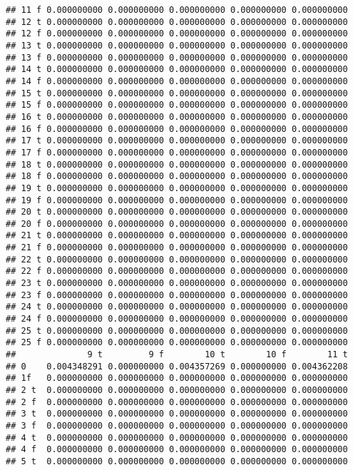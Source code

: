 \documentclass[]{article}
\begin{document}
\begin{verbatim}
## 11 f 0.000000000 0.000000000 0.000000000 0.000000000 0.000000000
## 12 t 0.000000000 0.000000000 0.000000000 0.000000000 0.000000000
## 12 f 0.000000000 0.000000000 0.000000000 0.000000000 0.000000000
## 13 t 0.000000000 0.000000000 0.000000000 0.000000000 0.000000000
## 13 f 0.000000000 0.000000000 0.000000000 0.000000000 0.000000000
## 14 t 0.000000000 0.000000000 0.000000000 0.000000000 0.000000000
## 14 f 0.000000000 0.000000000 0.000000000 0.000000000 0.000000000
## 15 t 0.000000000 0.000000000 0.000000000 0.000000000 0.000000000
## 15 f 0.000000000 0.000000000 0.000000000 0.000000000 0.000000000
## 16 t 0.000000000 0.000000000 0.000000000 0.000000000 0.000000000
## 16 f 0.000000000 0.000000000 0.000000000 0.000000000 0.000000000
## 17 t 0.000000000 0.000000000 0.000000000 0.000000000 0.000000000
## 17 f 0.000000000 0.000000000 0.000000000 0.000000000 0.000000000
## 18 t 0.000000000 0.000000000 0.000000000 0.000000000 0.000000000
## 18 f 0.000000000 0.000000000 0.000000000 0.000000000 0.000000000
## 19 t 0.000000000 0.000000000 0.000000000 0.000000000 0.000000000
## 19 f 0.000000000 0.000000000 0.000000000 0.000000000 0.000000000
## 20 t 0.000000000 0.000000000 0.000000000 0.000000000 0.000000000
## 20 f 0.000000000 0.000000000 0.000000000 0.000000000 0.000000000
## 21 t 0.000000000 0.000000000 0.000000000 0.000000000 0.000000000
## 21 f 0.000000000 0.000000000 0.000000000 0.000000000 0.000000000
## 22 t 0.000000000 0.000000000 0.000000000 0.000000000 0.000000000
## 22 f 0.000000000 0.000000000 0.000000000 0.000000000 0.000000000
## 23 t 0.000000000 0.000000000 0.000000000 0.000000000 0.000000000
## 23 f 0.000000000 0.000000000 0.000000000 0.000000000 0.000000000
## 24 t 0.000000000 0.000000000 0.000000000 0.000000000 0.000000000
## 24 f 0.000000000 0.000000000 0.000000000 0.000000000 0.000000000
## 25 t 0.000000000 0.000000000 0.000000000 0.000000000 0.000000000
## 25 f 0.000000000 0.000000000 0.000000000 0.000000000 0.000000000
##              9 t         9 f        10 t        10 f        11 t
## 0    0.004348291 0.000000000 0.004357269 0.000000000 0.004362208
## 1f   0.000000000 0.000000000 0.000000000 0.000000000 0.000000000
## 2 t  0.000000000 0.000000000 0.000000000 0.000000000 0.000000000
## 2 f  0.000000000 0.000000000 0.000000000 0.000000000 0.000000000
## 3 t  0.000000000 0.000000000 0.000000000 0.000000000 0.000000000
## 3 f  0.000000000 0.000000000 0.000000000 0.000000000 0.000000000
## 4 t  0.000000000 0.000000000 0.000000000 0.000000000 0.000000000
## 4 f  0.000000000 0.000000000 0.000000000 0.000000000 0.000000000
## 5 t  0.000000000 0.000000000 0.000000000 0.000000000 0.000000000

\end{verbatim}
\end{document}
